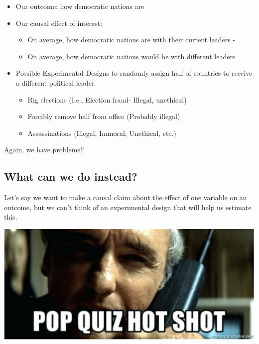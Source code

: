 \documentclass[
  letterpaper,
  DIV=11,
  numbers=noendperiod]{scrreprt}
\providecommand{\tightlist}{%
  \setlength{\itemsep}{0pt}\setlength{\parskip}{0pt}}\usepackage{longtable,booktabs,array}
\begin{document}
\begin{itemize}
\tightlist
\item
  Our outcome: how democratic nations are
\item
  Our causal effect of interest:

  \begin{itemize}
  \tightlist
  \item
    On average, how democratic nations are with their current leaders -
  \item
    On average, how democratic nations would be with different leaders
  \end{itemize}
\item
  Possible Experimental Designs to randomly assign half of countries to
  receive a different political leader

  \begin{itemize}
  \tightlist
  \item
    Rig elections (I.e., Election fraud- Illegal, unethical)
  \item
    Forcibly remove half from office (Probably illegal)
  \item
    Assassinations (Illegal, Immoral, Unethical, etc.)
  \end{itemize}
\end{itemize}

Again, we have problems!!

\hypertarget{what-can-we-do-instead}{%
\subsection{What can we do instead?}\label{what-can-we-do-instead}}

Let's say we want to make a causal claim about the effect of one
variable on an outcome, but we can't think of an experimental design
that will help us estimate this.

\includegraphics{images/popquiz.png}
\end{document}
